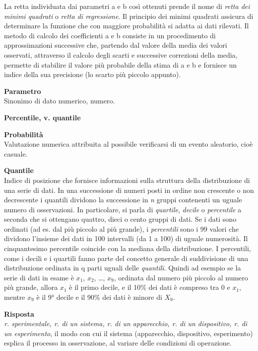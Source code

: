\documentclass[
  11pt,
]{book}
\begin{document}
La retta individuata dai parametri a e b così ottenuti prende il nome di \emph{retta dei minimi quadrati} o \emph{retta di regressione}.
Il principio dei minimi quadrati assicura di determinare la funzione che con maggiore probabilità si adatta ai dati rilevati.
Il metodo di calcolo dei coefficienti a e b consiste in un procedimento di approssimazioni successive che, partendo dal valore della media dei valori osservati, attraverso il calcolo degli scarti e successive correzioni della media, permette di stabilire il valore più probabile della stima di a e b e fornisce un indice della sua precisione (lo scarto più piccolo appunto).

\textbf{Parametro}\\
Sinonimo di dato numerico, numero.

\textbf{Percentile, v. quantile}

\textbf{Probabilità}\\
Valutazione numerica attribuita al possibile verificarsi di un evento aleatorio, cioè casuale.

\textbf{Quantile}\\
Indice di posizione che fornisce informazioni sulla struttura della distribuzione di una serie di dati.
In una successione di numeri posti in ordine non crescente o non decrescente i quantili dividono la successione in \emph{n} gruppi contenenti un uguale numero di osservazioni.
In particolare, si parla di \emph{quartile}, \emph{decile} o \emph{percentile} a seconda che si ottengano quattro, dieci o cento gruppi di dati.
Se i dati sono ordinati (ad es. dal più piccolo al più grande), i \emph{percentili} sono i 99 valori che dividono l'insieme dei dati in 100 intervalli (da 1 a 100) di uguale numerosità.
Il cinquantesimo percentile coincide con la mediana della distribuzione.
I percentili, come i decili e i quartili fanno parte del concetto generale di suddivisione di una distribuzione ordinata in q parti uguali delle \emph{quantili}. Quindi ad esempio se la serie di dati in esame è \(x_1\), \(x_2\), \ldots, \(x_9\), ordinata dal numero più piccolo al numero più grande, allora \(x_1\) è il primo decile, e il 10\% dei dati è compreso tra 0 e \(x_1\), mentre \(x_9\) è il 9° decile e il 90\% dei dati è minore di \(X_9\).

\textbf{Risposta}\\
\emph{r. sperimentale, r. di un sistema, r. di un apparecchio, r. di un dispositivo, r. di un esperimento}, il modo con cui il sistema (apparecchio, dispositivo, esperimento) esplica il processo in osservazione, al variare delle condizioni di operazione.
\end{document}
